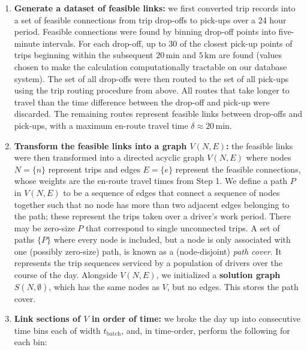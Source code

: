 \documentclass[]{trbunofficial_bdit_final}
\begin{document}
\begin{enumerate}
\def\labelenumi{\arabic{enumi}.}
\item
  \textbf{Generate a dataset of feasible links:} we first converted trip records
  into a set of feasible connections from trip drop-offs to pick-ups
  over a 24 hour period. Feasible connections were found by binning drop-off
  points into five-minute intervals. For each drop-off, up to 30 of the
  closest pick-up points of trips beginning within the subsequent
  \(20\,\mathrm{min}\) and \(5\,\mathrm{km}\) are found (values
  chosen to make the calculation computationally tractable on our
  database system). The set of all drop-offs were then routed to the set of
  all pick-ups using the trip routing procedure from above. All routes
  that take longer to travel than the time difference between the
  drop-off and pick-up were discarded. The remaining routes represent
  feasible links between drop-offs and pick-ups, with a maximum en-route
  travel time \(\delta \approx 20\,\mathrm{min}\).
\item
  \textbf{Transform the feasible links into a graph \(V(N, E)\):} the feasible links
  were then transformed into a directed acyclic graph \(V(N, E)\) where nodes
  \(N = \{n\}\) represent trips and edges \(E = \{e\}\) represent the feasible
  connections, whose weights are the en-route travel times from Step 1. We
  define a path \(P\) in \(V(N, E)\) to be a sequence of edges that connect a
  sequence of nodes together such that no node has more than two adjacent
  edges belonging to the path; these represent the trips taken over a
  driver's work period. There may be zero-size \(P\) that correspond to single
  unconnected trips. A set of paths \(\{P\}\) where every node is included, but
  a node is only associated with one (possibly zero-size) path, is known as a
  (node-disjoint) \emph{path cover}. It represents the trip sequences serviced by
  a population of drivers over the course of the day. Alongside \(V(N, E)\), we initialized a \textbf{solution graph} \(S(N, \emptyset)\), which has the
  same nodes as \(V\), but no edges. This stores the path cover.
\item
  \textbf{Link sections of \(V\) in order of time:} we broke the day up into
  consecutive time bins each of width \(t_\mathrm{batch}\), and, in time-order,
  perform the following for each bin:


\end{enumerate}
\end{document}

